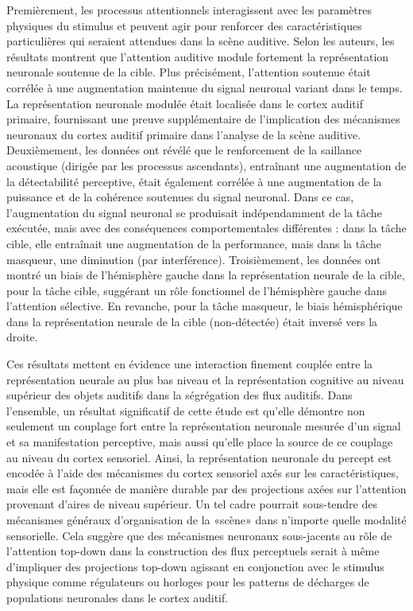 Premièrement, les processus attentionnels interagissent avec les paramètres physiques du stimulus et peuvent agir pour renforcer des caractéristiques particulières qui seraient attendues dans la scène auditive. 
Selon les auteurs, les résultats montrent que l'attention auditive module fortement la représentation neuronale soutenue de la cible. 
Plus précisément, l'attention soutenue était corrélée à une augmentation maintenue du signal neuronal variant dans le temps. 
La représentation neuronale modulée était localisée dans le cortex auditif primaire, fournissant une preuve supplémentaire de l'implication des mécanismes neuronaux du cortex auditif primaire dans l'analyse de la scène auditive.
Deuxièmement, les données ont révélé que le renforcement de la saillance acoustique (dirigée par les processus ascendants), entraînant une augmentation de la détectabilité perceptive, était également corrélée à une augmentation de la puissance et de la cohérence soutenues du signal neuronal. 
Dans ce cas, l'augmentation du signal neuronal se produisait indépendamment de la tâche exécutée, mais avec des conséquences comportementales différentes : dans la tâche cible, elle entraînait une augmentation de la performance, mais dans la tâche masqueur, une diminution (par interférence). 
Troisièmement, les données ont montré un biais de l'hémisphère gauche dans la représentation neurale de la cible, pour la tâche cible, suggérant un rôle fonctionnel de l'hémisphère gauche dans l'attention sélective. 
En revanche, pour la tâche masqueur, le biais hémisphérique dans la représentation neurale de la cible (non-détectée) était inversé vers la droite. 

Ces résultats mettent en évidence une interaction finement couplée entre la représentation neurale au plus bas niveau et la représentation cognitive au niveau supérieur des objets auditifs dans la ségrégation des flux auditifs. 
Dans l'ensemble, un résultat significatif de cette étude est qu'elle démontre non seulement un couplage fort entre la représentation neuronale mesurée d'un signal et sa manifestation perceptive, mais aussi qu'elle place la source de ce couplage au niveau du cortex sensoriel. 
Ainsi, la représentation neuronale du percept est encodée à l'aide des mécanismes du cortex sensoriel axés sur les caractéristiques, mais elle est façonnée de manière durable par des projections axées sur l'attention provenant d'aires de niveau supérieur. 
Un tel cadre pourrait sous-tendre des mécanismes généraux d'organisation de la «scène» dans n'importe quelle modalité sensorielle.
Cela suggère que des mécanismes neuronaux sous-jacents au rôle de l'attention top-down dans la construction des flux perceptuels serait à même d'impliquer des projections top-down agissant en conjonction avec le stimulus physique comme régulateurs ou horloges pour les patterns de décharges de populations neuronales dans le cortex auditif. 

